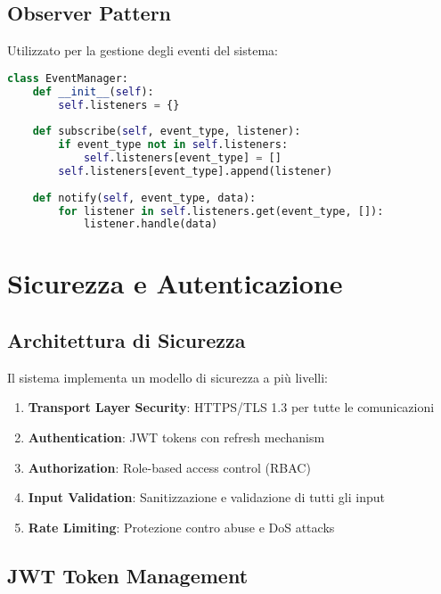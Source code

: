 \documentclass[12pt,a4paper]{report}
\begin{document}
\subsection{Observer Pattern}

Utilizzato per la gestione degli eventi del sistema:

\begin{lstlisting}[language=Python, caption=Event System]
class EventManager:
    def __init__(self):
        self.listeners = {}
    
    def subscribe(self, event_type, listener):
        if event_type not in self.listeners:
            self.listeners[event_type] = []
        self.listeners[event_type].append(listener)
    
    def notify(self, event_type, data):
        for listener in self.listeners.get(event_type, []):
            listener.handle(data)
\end{lstlisting}

\section{Sicurezza e Autenticazione}

\subsection{Architettura di Sicurezza}

Il sistema implementa un modello di sicurezza a più livelli:

\begin{enumerate}
    \item \textbf{Transport Layer Security}: HTTPS/TLS 1.3 per tutte le comunicazioni
    \item \textbf{Authentication}: JWT tokens con refresh mechanism
    \item \textbf{Authorization}: Role-based access control (RBAC)
    \item \textbf{Input Validation}: Sanitizzazione e validazione di tutti gli input
    \item \textbf{Rate Limiting}: Protezione contro abuse e DoS attacks
\end{enumerate}

\subsection{JWT Token Management}
\end{document}
